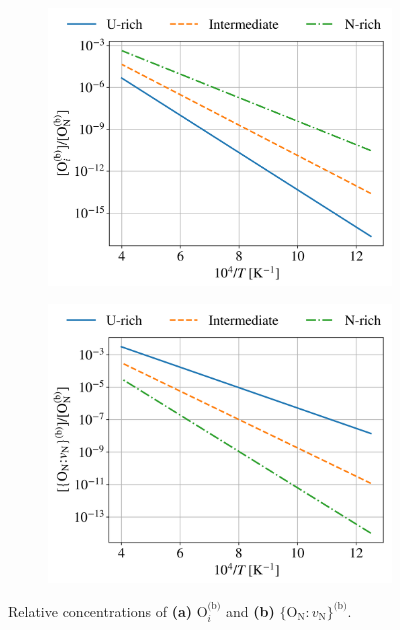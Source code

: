 \documentclass[preprint,12pt,sort&compress]{elsarticle}
\newcommand{\?}{\stackrel{?}{=}}
\begin{document}
\begin{figure}[h!]
\centering
\begin{subfigure}{0.48\textwidth}
    \includegraphics[width=\textwidth]{Oi_ON.png}
    \caption{}
    \label{Fig:Oi_ON}
\end{subfigure}
\hfill
\begin{subfigure}{0.48\textwidth}
    \includegraphics[width=\textwidth]{ONVN_ON.png}
    \caption{}
    \label{Fig:ONVN_ON}
\end{subfigure}
\caption{Relative concentrations of \textbf{(a)} $\text{O}_i^\text{(b)}$ and \textbf{(b)} $\{\text{O}_\text{N} \! : \! v_\text{N}\}^\text{(b)}$.}
\label{2}
\end{figure}
\end{document}
